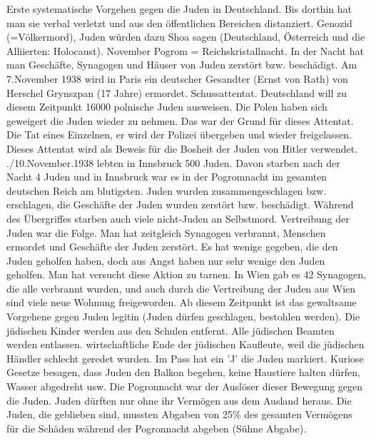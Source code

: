 \documentclass[a4paper,final]{book}
\begin{document}
Erste systematische Vorgehen gegen die Juden in Deutschland. Bis dorthin hat man sie verbal verletzt und aus den öffentlichen Bereichen distanziert.  Genozid (=Völkermord), Juden würden dazu Shoa sagen (Deutschland, Österreich und die Alliierten: Holocaust). November Pogrom = Reichskristallnacht. In der Nacht hat man Geschäfte, Synagogen und Häuser von Juden zerstört bzw. beschädigt. 
\newline
\newline
Am 7.November 1938 wird in Paris ein deutscher Gesandter (Ernst von Rath) von Herschel Grynszpan (17 Jahre) ermordet. Schussattentat. Deutschland will zu diesem Zeitpunkt 16000 polnische Juden ausweisen. Die Polen haben sich geweigert die Juden wieder zu nehmen. Das war der Grund für dieses Attentat. Die Tat eines Einzelnen, er wird der Polizei übergeben und wieder freigelassen. Dieses Attentat wird als Beweis für die Bosheit der Juden von Hitler verwendet.
\newline
{}./10.November.1938 lebten in Innsbruck 500 Juden. Davon starben nach der Nacht 4 Juden und in Innsbruck war es in der Pogromnacht im gesamten deutschen Reich am blutigsten. Juden wurden zusammengeschlagen bzw. erschlagen, die Geschäfte der Juden wurden zerstört bzw. beschädigt. Während des Übergriffes starben auch viele nicht-Juden an Selbstmord. Vertreibung der Juden war die Folge.
\newline
\newline
Man hat zeitgleich Synagogen verbrannt, Menschen ermordet und Geschäfte der Juden zerstört. Es hat wenige gegeben, die den Juden geholfen haben, doch aus Angst haben nur sehr wenige den Juden geholfen. Man hat versucht diese Aktion zu tarnen.
\newline
\newline
In Wien gab es 42 Synagogen, die alle verbrannt wurden, und auch durch die Vertreibung der Juden aus Wien sind viele neue Wohnung freigeworden.
\newline
\newline
Ab diesem Zeitpunkt ist das gewaltsame Vorgehene gegen Juden legitin (Juden dürfen geschlagen, bestohlen werden). Die jüdischen Kinder werden aus den Schulen entfernt. Alle jüdischen Beamten werden entlassen. wirtschaftliche Ende der jüdischen Kaufleute, weil die jüdischen Händler schlecht geredet wurden. Im Pass hat ein 'J' die Juden markiert. Kuriose Gesetze besagen, dass Juden den Balkon begehen, keine Haustiere halten dürfen, Wasser abgedreht usw. Die Pogronnacht war der Auslöser dieser Bewegung gegen die Juden. Juden dürften nur ohne ihr Vermögen aus dem Ausland heraus. Die Juden, die geblieben sind, mussten Abgaben von 25\% des gesamten Vermögens für die Schäden während der Pogronnacht abgeben (Sühne Abgabe).
\end{document}
